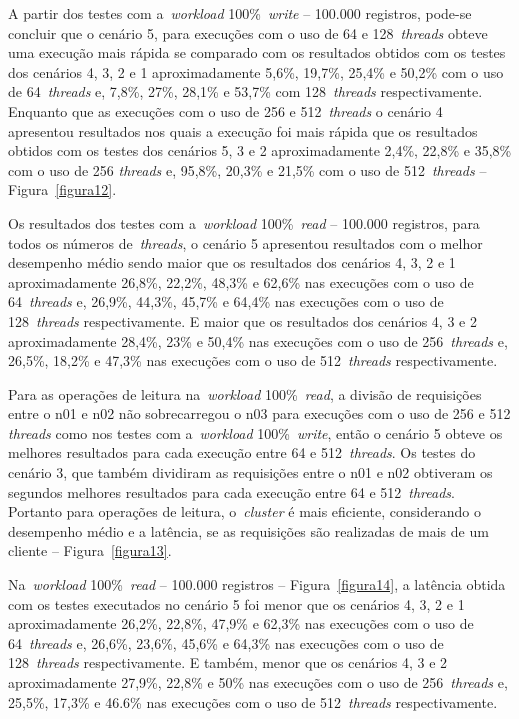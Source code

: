 \documentclass[12pt]{article}
\begin{document}
A partir dos testes com a~\emph{workload} 100\%~\emph{write} -- 100.000 registros, pode-se concluir que o cenário 5, para execuções com o uso de 64 e 128~\emph{threads} obteve uma execução mais rápida se comparado com os resultados obtidos com os testes dos cenários 4, 3, 2 e 1 aproximadamente 5,6\%, 19,7\%, 25,4\% e 50,2\% com o uso de 64~\emph{threads} e, 7,8\%, 27\%, 28,1\% e 53,7\% com 128~\emph{threads} respectivamente. Enquanto que as execuções com o uso de 256 e 512~\emph{threads} o cenário 4 apresentou resultados nos quais a execução foi mais rápida que os resultados obtidos com os testes dos cenários 5, 3 e 2 aproximadamente 2,4\%, 22,8\% e 35,8\% com o uso de 256 \emph{threads} e, 95,8\%, 20,3\% e 21,5\% com o uso de 512~\emph{threads} -- Figura~\ref{figura12}.

Os resultados dos testes com a~\emph{workload} 100\%~\emph{read} -- 100.000 registros, para todos os números de~\emph{threads}, o cenário 5 apresentou resultados com o melhor desempenho médio sendo maior que os resultados dos cenários 4, 3, 2 e 1 aproximadamente 26,8\%, 22,2\%, 48,3\% e 62,6\% nas execuções com o uso de 64~\emph{threads} e, 26,9\%, 44,3\%, 45,7\% e 64,4\% nas execuções com o uso de 128~\emph{threads} respectivamente. E maior que os resultados dos cenários 4, 3 e 2 aproximadamente 28,4\%, 23\% e 50,4\% nas execuções com o uso de 256~\emph{threads} e, 26,5\%, 18,2\% e 47,3\% nas execuções com o uso de 512~\emph{threads} respectivamente.

Para as operações de leitura na~\emph{workload} 100\%~\emph{read}, a divisão de requisições entre o n01 e n02 não sobrecarregou o n03 para execuções com o uso de 256 e 512 \emph{threads} como nos testes com a~\emph{workload} 100\%~\emph{write}, então o cenário 5 obteve os melhores resultados para cada execução entre 64 e 512~\emph{threads}. Os testes do cenário 3, que também dividiram as requisições entre o n01 e n02 obtiveram os segundos melhores resultados para cada execução entre 64 e 512~\emph{threads}. Portanto para operações de leitura, o~\emph{cluster} é mais eficiente, considerando o desempenho médio e a latência, se as requisições são realizadas de mais de um cliente -- Figura~\ref{figura13}.

Na~\emph{workload} 100\%~\emph{read} -- 100.000 registros -- Figura~\ref{figura14}, a latência obtida com os testes executados no cenário 5 foi menor que os cenários 4, 3, 2 e 1 aproximadamente 26,2\%, 22,8\%, 47,9\% e 62,3\% nas execuções com o uso de 64~\emph{threads} e, 26,6\%, 23,6\%, 45,6\% e 64,3\% nas execuções com o uso de 128~\emph{threads} respectivamente. E também, menor que os cenários 4, 3 e 2 aproximadamente 27,9\%, 22,8\% e 50\% nas execuções com o uso de 256~\emph{threads} e, 25,5\%, 17,3\% e 46.6\% nas execuções com o uso de 512~\emph{threads} respectivamente.
\end{document}
